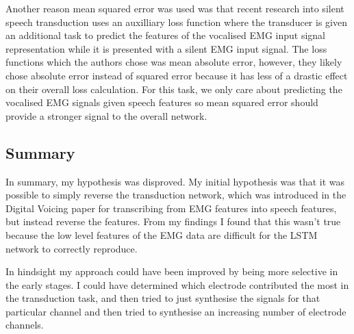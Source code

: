 Another
reason mean squared error was used was that recent research into
silent speech transduction uses an auxilliary loss function where the
transducer is given an additional task to predict the features of
the vocalised EMG input signal representation while it is presented
with a silent EMG input signal. The loss functions which the authors
chose was mean absolute error, however, they likely chose absolute
error instead of squared error because it has less of a drastic
effect on their overall loss calculation. For this task, we only
care about predicting the vocalised EMG signals given speech features
so mean squared error should provide a stronger signal to the overall
network.

\subsection{Summary}

In summary, my hypothesis was disproved.
My initial hypothesis was that it was possible to simply reverse the
transduction network, which was introduced in the Digital Voicing paper
for transcribing from EMG features into speech features, but instead
reverse the features.
From my findings I found that this wasn't true because the low level 
features of the EMG data are difficult for the LSTM network to correctly reproduce.

In hindsight my approach could have been improved by being more selective in
the early stages. I could have determined which electrode contributed the most
in the transduction task, and then tried to just synthesise the signals for that 
particular channel and then tried to synthesise an increasing number of electrode channels.